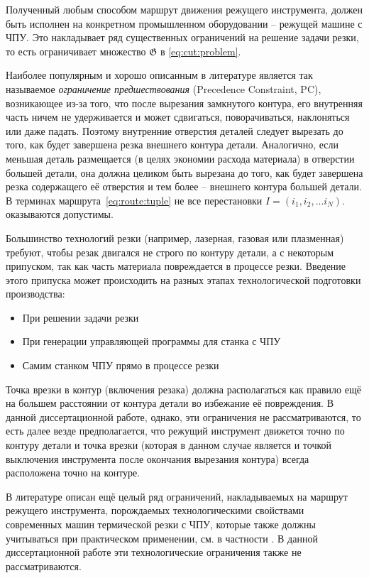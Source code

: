 Полученный любым способом
маршрут движения режущего инструмента,
должен быть исполнен
на конкретном промышленном оборудовании --
режущей машине с ЧПУ.
Это накладывает ряд
существенных ограничений
на решение задачи резки,
то есть ограничивает множество
$\mathfrak G$ в \eqref{eq:cut:problem}.

Наиболее популярным и хорошо описанным в литературе
является так называемое
{\it ограничение предшествования}
(Precedence Constraint, PC),
возникающее из-за того,
что
после вырезания замкнутого контура,
его внутренняя часть ничем не удерживается
и может сдвигаться, поворачиваться, наклоняться
или даже падать.
Поэтому внутренние отверстия деталей следует
вырезать до того,
как будет завершена резка
внешнего контура детали.
Аналогично,
если меньшая деталь размещается
(в целях экономии расхода материала)
в отверстии большей детали,
она должна целиком быть вырезана
до того,
как будет завершена резка
содержащего её отверстия
и тем более --
внешнего контура большей детали.
В терминах маршрута~\eqref{eq:route:tuple}
не все перестановки
$I = (i_1, i_2, ... i_N)$.
оказываются допустимы.

Большинство технологий резки
(например, лазерная, газовая или плазменная)
требуют,
чтобы резак двигался не строго по контуру детали,
а с некоторым припуском,
так как часть материала повреждается в процессе резки.
Введение этого припуска может происходить
на разных этапах технологической подготовки производства:
\begin{itemize}
  \item
  При решении задачи резки
  \item
  При генерации управляющей программы для станка с ЧПУ
  \item
  Самим станком ЧПУ прямо в процессе резки
\end{itemize}

Точка врезки в контур
(включения резака)
должна располагаться
как правило ещё на большем расстоянии
от контура детали
во избежание её повреждения.
В данной диссертационной работе,
однако,
эти ограничения не рассматриваются,
то есть
далее везде предполагается,
что режущий инструмент движется точно по контуру детали
и точка врезки
(которая в данном случае
является и точкой выключения инструмента
после окончания вырезания контура)
всегда расположена точно на контуре.

В литературе описан
ещё целый ряд ограничений,
накладываемых на маршрут режущего инструмента,
порождаемых
технологическими свойствами
современных машин термической резки с ЧПУ,
которые также должны учитываться
при практическом применении,
см. в частности
\cite{Sozopol,Miskolc}.
В данной диссертационной работе
эти технологические ограничения также не рассматриваются.
